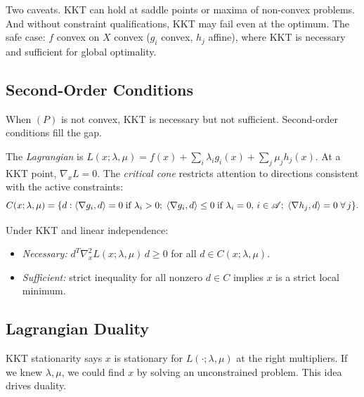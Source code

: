 Two caveats.
KKT can hold at saddle points or maxima of non-convex problems.
And without constraint qualifications, KKT may fail even at the optimum.
The safe case: $f$ convex on $X$ convex ($g_i$ convex, $h_j$ affine), where KKT is necessary and sufficient for global optimality.


\subsection{Second-Order Conditions}\label{ssec:sosc}

When $(P)$ is not convex, KKT is necessary but not sufficient.
Second-order conditions fill the gap.

\begin{defn}\label{def:lagrangian}
	The \textit{Lagrangian} is $L(x; \lambda, \mu) = f(x) + \sum_i \lambda_i g_i(x) + \sum_j \mu_j h_j(x)$.
	At a KKT point, $\nabla_x L = 0$.
	The \textit{critical cone} restricts attention to directions consistent with the active constraints:
	\begin{equation}\label{eq:critical-cone}
		C(x; \lambda, \mu) = \{d : \langle\nabla g_i, d\rangle = 0\;\text{if } \lambda_i > 0;\;
		\langle\nabla g_i, d\rangle \leq 0\;\text{if } \lambda_i = 0,\, i \in \mathcal{A};\;
		\langle\nabla h_j, d\rangle = 0\;\forall\, j\}.
	\end{equation}
\end{defn}

\begin{thm}\label{thm:sosc}
	Under KKT and linear independence:
	\begin{itemize}
		\item \textit{Necessary:} $d^T \nabla^2_x L(x; \lambda, \mu)\, d \geq 0$ for all $d \in C(x; \lambda, \mu)$.
		\item \textit{Sufficient:} strict inequality for all nonzero $d \in C$ implies $x$ is a strict local minimum.
	\end{itemize}
\end{thm}


\subsection{Lagrangian Duality}\label{ssec:duality}

KKT stationarity says $x$ is stationary for $L(\cdot; \lambda, \mu)$ at the right multipliers.
If we knew $\lambda, \mu$, we could find $x$ by solving an unconstrained problem.
This idea drives duality.

